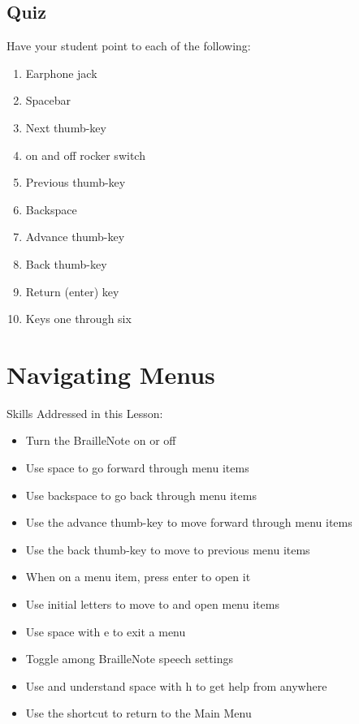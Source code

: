 \documentclass[10pt,letterpaper,twoside]{report}
\begin{document}
{{{\subsection{Quiz}
Have your student point to each of the following:
\begin{enumerate}
	\item Earphone jack
	\item Spacebar
	\item Next thumb-key
	\item on and off rocker switch
	\item Previous thumb-key
	\item Backspace
	\item Advance thumb-key
	\item Back thumb-key
	\item Return (enter) key
	\item Keys one through six
\end{enumerate}
\clearpage
\section{ Navigating Menus}
Skills Addressed in this Lesson:
\begin{itemize}
	\item Turn the BrailleNote on or off
	\item Use space to go forward through menu items
	\item Use backspace to go back through menu items
	\item Use the advance thumb-key to move forward through menu items
	\item Use the back thumb-key to move to previous menu items
	\item When on a menu item, press enter to open it
	\item Use initial letters to move to and open menu items
	\item Use space with e to exit a menu
	\item Toggle among BrailleNote speech settings
	\item Use and understand space with h to get help from anywhere
	\item Use the shortcut to return to the Main Menu
\end{itemize}
}}}
\end{document}
